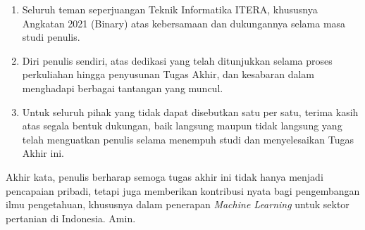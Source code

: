 \begin{justifying}
\begin{enumerate}[itemsep=1pt, topsep=0pt, parsep=0pt, partopsep=0pt]
		\item {Seluruh teman seperjuangan Teknik Informatika ITERA, khususnya Angkatan 2021 (Binary) atas kebersamaan dan dukungannya selama masa studi penulis.}
		\item {Diri penulis sendiri, atas dedikasi yang telah ditunjukkan selama proses perkuliahan hingga penyusunan Tugas Akhir, dan kesabaran dalam menghadapi berbagai tantangan yang muncul.}
		\item {Untuk seluruh pihak yang tidak dapat disebutkan satu per satu, terima kasih atas segala bentuk dukungan, baik langsung maupun tidak langsung yang telah menguatkan penulis selama menempuh studi dan menyelesaikan Tugas Akhir ini.}
	\end{enumerate} \par
	Akhir kata, penulis berharap semoga tugas akhir ini tidak hanya menjadi pencapaian pribadi, tetapi juga memberikan kontribusi nyata bagi pengembangan ilmu pengetahuan, khususnya dalam penerapan \textit{Machine Learning} untuk sektor pertanian di Indonesia. Amin.
	\vfill
	
\end{justifying}
\clearpage
